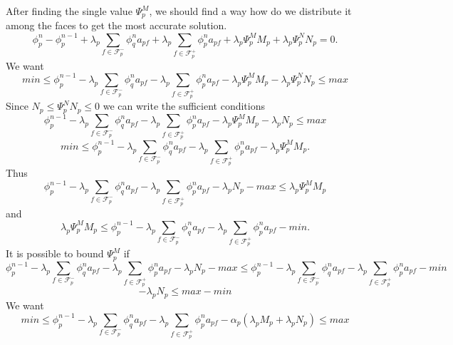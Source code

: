 \documentclass[../thesis.tex]{subfiles}
\begin{document}
After finding the single value \(\Psi_p^M\),
we should find a way how do we distribute it
among the faces to get the most accurate solution.
\begin{equation}
    \phi^{n}_p - \phi_p^{n-1}
    + \lambda_p \sum_{f \in \mathcal{F}_p^-} \phi_q^{n} a_{pf}
    + \lambda_p \sum_{f \in \mathcal{F}_p^+} \phi_p^{n} a_{pf}
    +\lambda_p \Psi_p^M M_p + \lambda_p \Psi_p^N N_p
    = 0.
\end{equation}
We want
\[
    min
    \leq
    \phi_p^{n-1}
    - \lambda_p \sum_{f \in \mathcal{F}_p^-} \phi_q^{n} a_{pf}
    - \lambda_p \sum_{f \in \mathcal{F}_p^+} \phi_p^{n} a_{pf}
    - \lambda_p \Psi_p^M M_p - \lambda_p \Psi_p^N N_p
    \leq
    max
\]
Since \( N_p \leq \Psi_p^N N_p \leq 0 \) we can write the
sufficient conditions
\[
    \phi_p^{n-1}
    - \lambda_p \sum_{f \in \mathcal{F}_p^-} \phi_q^{n} a_{pf}
    - \lambda_p \sum_{f \in \mathcal{F}_p^+} \phi_p^{n} a_{pf}
    - \lambda_p \Psi_p^M M_p - \lambda_p N_p
    \leq
    max
\]
\[
    min
    \leq
    \phi_p^{n-1}
    - \lambda_p \sum_{f \in \mathcal{F}_p^-} \phi_q^{n} a_{pf}
    - \lambda_p \sum_{f \in \mathcal{F}_p^+} \phi_p^{n} a_{pf}
    - \lambda_p \Psi_p^M M_p.
\]
Thus
\[
    \phi_p^{n-1}
    - \lambda_p \sum_{f \in \mathcal{F}_p^-} \phi_q^{n} a_{pf}
    - \lambda_p \sum_{f \in \mathcal{F}_p^+} \phi_p^{n} a_{pf}
    - \lambda_p N_p - max
    \leq
    \lambda_p \Psi_p^M M_p
\]
and
\[
    \lambda_p \Psi_p^M M_p
    \leq
    \phi_p^{n-1}
    - \lambda_p \sum_{f \in \mathcal{F}_p^-} \phi_q^{n} a_{pf}
    - \lambda_p \sum_{f \in \mathcal{F}_p^+} \phi_p^{n} a_{pf}
    - min.
\]
It is possible to bound \(\Psi_p^M\) if
\[
    \phi_p^{n-1}
    - \lambda_p \sum_{f \in \mathcal{F}_p^-} \phi_q^{n} a_{pf}
    - \lambda_p \sum_{f \in \mathcal{F}_p^+} \phi_p^{n} a_{pf}
    - \lambda_p N_p - max
    \leq
    \phi_p^{n-1}
    - \lambda_p \sum_{f \in \mathcal{F}_p^-} \phi_q^{n} a_{pf}
    - \lambda_p \sum_{f \in \mathcal{F}_p^+} \phi_p^{n} a_{pf}
    - min
\]
\[
    - \lambda_p N_p
    \leq
    max - min
\]
\newpage
We want
\[
    min
    \leq
    \phi_p^{n-1}
    - \lambda_p \sum_{f \in \mathcal{F}_p^-} \phi_q^{n} a_{pf}
    - \lambda_p \sum_{f \in \mathcal{F}_p^+} \phi_p^{n} a_{pf}
    - \alpha_p \left( \lambda_p M_p + \lambda_p N_p \right)
    \leq
    max
\]
\end{document}

